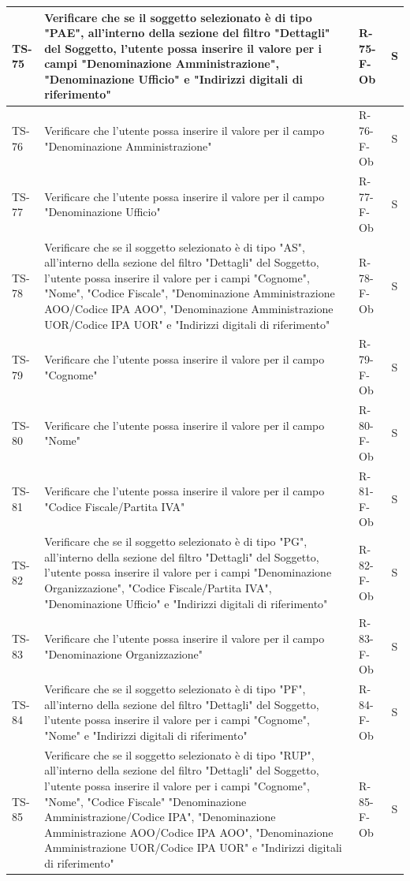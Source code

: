 \documentclass[a4paper,12pt]{article}
\begin{document}
\begin{longtable}{|p{1.5cm}|p{8.3cm}|p{2.4cm}|c|}
\hline
TS-75 & Verificare che se il soggetto selezionato è di tipo "PAE", all'interno della sezione del filtro "Dettagli" del Soggetto, l'utente possa inserire il valore per i campi "Denominazione Amministrazione", "Denominazione Ufficio" e "Indirizzi digitali di riferimento" & R-75-F-Ob & S \\
\hline
TS-76 & Verificare che l'utente possa inserire il valore per il campo "Denominazione Amministrazione" & R-76-F-Ob & S \\
\hline
TS-77 & Verificare che l'utente possa inserire il valore per il campo "Denominazione Ufficio" & R-77-F-Ob & S \\
\hline
TS-78 & Verificare che se il soggetto selezionato è di tipo "AS", all'interno della sezione del filtro "Dettagli" del Soggetto, l'utente possa inserire il valore per i campi "Cognome", "Nome", "Codice Fiscale", "Denominazione Amministrazione AOO/Codice IPA AOO", "Denominazione Amministrazione UOR/Codice IPA UOR" e "Indirizzi digitali di riferimento" & R-78-F-Ob & S \\
\hline
TS-79 & Verificare che l'utente possa inserire il valore per il campo "Cognome" & R-79-F-Ob & S \\
\hline
TS-80 & Verificare che l'utente possa inserire il valore per il campo "Nome" & R-80-F-Ob & S \\
\hline
TS-81 & Verificare che l'utente possa inserire il valore per il campo "Codice Fiscale/Partita IVA" & R-81-F-Ob & S \\
\hline
TS-82 & Verificare che se il soggetto selezionato è di tipo "PG", all'interno della sezione del filtro "Dettagli" del Soggetto, l'utente possa inserire il valore per i campi "Denominazione Organizzazione", "Codice Fiscale/Partita IVA", "Denominazione Ufficio" e "Indirizzi digitali di riferimento" & R-82-F-Ob & S \\
\hline
TS-83 & Verificare che l'utente possa inserire il valore per il campo "Denominazione Organizzazione" & R-83-F-Ob & S \\
\hline
TS-84 & Verificare che se il soggetto selezionato è di tipo "PF", all'interno della sezione del filtro "Dettagli" del Soggetto, l'utente possa inserire il valore per i campi "Cognome", "Nome" e "Indirizzi digitali di riferimento" & R-84-F-Ob & S \\
\hline
TS-85 & Verificare che se il soggetto selezionato è di tipo "RUP", all'interno della sezione del filtro "Dettagli" del Soggetto, l'utente possa inserire il valore per i campi "Cognome", "Nome", "Codice Fiscale" "Denominazione Amministrazione/Codice IPA", "Denominazione Amministrazione AOO/Codice IPA AOO", "Denominazione Amministrazione UOR/Codice IPA UOR" e "Indirizzi digitali di riferimento" & R-85-F-Ob & S \\

\end{longtable}
\end{document}
